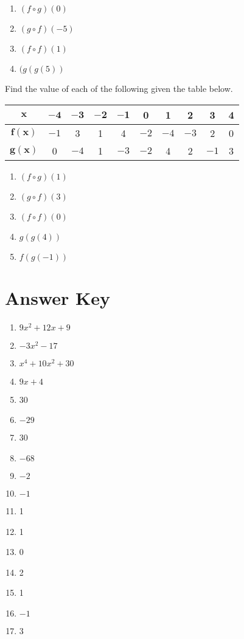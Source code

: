 \begin{multicols}{4}
\begin{enumerate}	\setcounter{enumi}{\value{Review}}
	\item $(f \circ g)(0)$
	\item $(g \circ f)(-5)$
	\item $(f \circ f)(1)$
	\item $(g(g(5))$
\end{enumerate}	\setcounter{Review}{\value{enumi}}
\end{multicols}

Find the value of each of the following given the table below.
\begin{center}
\begin{tabular}{c|c|c|c|c|c|c|c|c|c}
    $\mathbf{x}$ & $\mathbf{-4}$ & $\mathbf{-3}$ & $\mathbf{-2}$ & $\mathbf{-1}$ & \textbf{0} & \textbf{1} & \textbf{2} & \textbf{3} & \textbf{4} \\ \hline
    $\mathbf{f(x)}$ & $-1$ & 3 & 1 & 4 & $-2$ & $-4$ & $-3$ & 2 & 0 \\ \hline
    $\mathbf{g(x)}$ & 0 & $-4$ & 1 & $-3$ & $-2$ & 4 & 2 & $-1$ & 3 \\
\end{tabular}
\end{center}

\begin{multicols}{5}
\begin{enumerate}	\setcounter{enumi}{\value{Review}}
	\item $(f \circ g)(1)$
	\item $(g \circ f)(3)$
	\item $(f \circ f)(0)$
	\item $g(g(4))$
	\item $f(g(-1))$
\end{enumerate}		\setcounter{Review}{\value{enumi}}
\end{multicols}

\newpage

\section*{Answer Key}

\begin{enumerate}
	\item $9x^2+12x+9$
    \item $-3x^2-17$
    \item $x^4+10x^2+30$
    \item $9x+4$
    \item 30
    \item $-29$
    \item 30
    \item $-68$
    \item $-2$
    \item $-1$
    \item 1
    \item 1
    \item 0
    \item 2
    \item 1
    \item $-1$
    \item 3
\end{enumerate}
